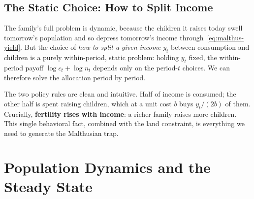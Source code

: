 \subsection{The Static Choice: How to Split Income}

The family's full problem is dynamic, because the children it raises today swell tomorrow's population and so depress tomorrow's income through~\eqref{eq:malthus-yield}. But the choice of \emph{how to split a given income} $y_t$ between consumption and children is a purely within-period, static problem: holding $y_t$ fixed, the within-period payoff $\log c_t + \log n_t$ depends only on the period-$t$ choices. We can therefore solve the allocation period by period.



The two policy rules are clean and intuitive. Half of income is consumed; the other half is spent raising children, which at a unit cost $b$ buys $y_t/(2b)$ of them. Crucially, \textbf{fertility rises with income}: a richer family raises more children. This single behavioral fact, combined with the land constraint, is everything we need to generate the Malthusian trap.

\section{Population Dynamics and the Steady State}

